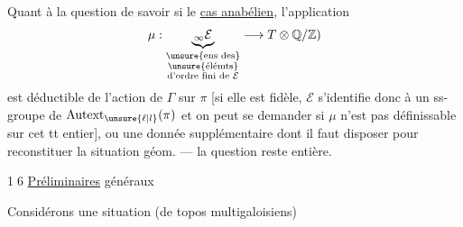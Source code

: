 Quant à la question de savoir si
 le \uline{cas anabélien},
l'application
\[
\mu:\underbrace{{}_\infty\mathcal E}_{
\substack{\text{\unsure{ens des}}\\
\text{\unsure{élémts}}\\
\text{d'ordre fini de }\mathcal E}}
\longrightarrow T\otimes\mathbb Q/\mathbb Z)
\]
est déductible de l'action de \(\Gamma\) sur \(\pi\)
[si elle est fidèle, \(\mathcal E\) s'identifie donc à un ss-groupe
de \(\operatorname{Autext}_{\unsure{\ell|l}}(\pi)\)
et on peut se demander si \(\mu\) n'est pas
 définissable sur cet tt entier],
ou  une donnée supplémentaire dont il faut disposer pour
reconstituer la situation géom. --- la question reste entière.

\textcircled{16}\quad
{}
\uline{Préliminaires}  généraux

Considérons une situation
(de topos multigaloisiens)


